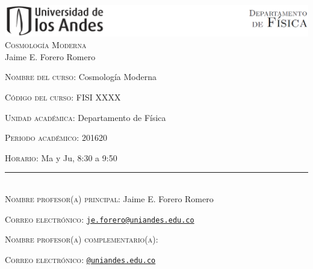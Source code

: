 \documentclass[letterpaper,10pt,onecolumn]{article}
\begin{document}
\begin{center}

\includegraphics[width=490pt]{header.png}\\[0.5cm]

\textsc{\LARGE Cosmolog\'ia Moderna}\\[0.1cm]

\large Jaime E. Forero Romero\\[0.5cm]

\end{center}

\large \noindent\textsc{Nombre del curso:}  Cosmolog\'ia Moderna%
  
\noindent\textsc{C\'odigo del curso:} FISI XXXX %

\noindent\textsc{Unidad acad\'emica:} Departamento de F\'isica

\noindent\textsc{Periodo acad\'emico:} 201620 %

\noindent\textsc{Horario:} Ma y Ju, 8:30 a 9:50 %

\noindent\rule{\textwidth}{1pt}\\[-0.3cm]

\normalsize \noindent\textsc{Nombre profesor(a) principal:} Jaime
E. Forero Romero%

\noindent\textsc{Correo electr\'onico:}
\href{mailto:je.forero@uniandes.edu.co}{\nolinkurl{je.forero@uniandes.edu.co}}


\noindent\textsc{Nombre profesor(a) complementario(a):} %

\noindent\textsc{Correo electr\'onico:}
\href{mailto:@uniandes.edu.co}{\nolinkurl{@uniandes.edu.co}}

\end{document}
